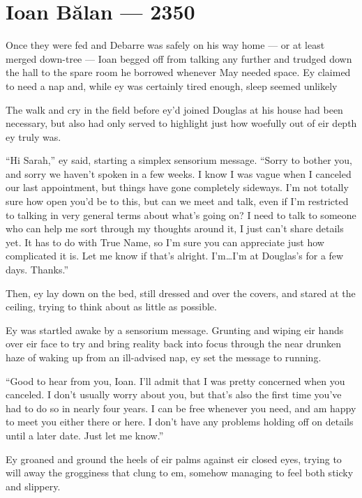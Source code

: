 \hypertarget{ioan-bux103lan-2350}{%
\chapter{Ioan Bălan — 2350}\label{ioan-bux103lan-2350}}

Once they were fed and Debarre was safely on his way home — or at least merged down-tree — Ioan begged off from talking any further and trudged down the hall to the spare room he borrowed whenever May needed space. Ey claimed to need a nap and, while ey was certainly tired enough, sleep seemed unlikely

The walk and cry in the field before ey'd joined Douglas at his house had been necessary, but also had only served to highlight just how woefully out of eir depth ey truly was.

``Hi Sarah,'' ey said, starting a simplex sensorium message. ``Sorry to bother you, and sorry we haven't spoken in a few weeks. I know I was vague when I canceled our last appointment, but things have gone completely sideways. I'm not totally sure how open you'd be to this, but can we meet and talk, even if I'm restricted to talking in very general terms about what's going on? I need to talk to someone who can help me sort through my thoughts around it, I just can't share details yet. It has to do with True Name, so I'm sure you can appreciate just how complicated it is. Let me know if that's alright. I'm\ldots I'm at Douglas's for a few days. Thanks.''

Then, ey lay down on the bed, still dressed and over the covers, and stared at the ceiling, trying to think about as little as possible.

Ey was startled awake by a sensorium message. Grunting and wiping eir hands over eir face to try and bring reality back into focus through the near drunken haze of waking up from an ill-advised nap, ey set the message to running.

``Good to hear from you, Ioan. I'll admit that I was pretty concerned when you canceled. I don't usually worry about you, but that's also the first time you've had to do so in nearly four years. I can be free whenever you need, and am happy to meet you either there or here. I don't have any problems holding off on details until a later date. Just let me know.''

Ey groaned and ground the heels of eir palms against eir closed eyes, trying to will away the grogginess that clung to em, somehow managing to feel both sticky and slippery.

